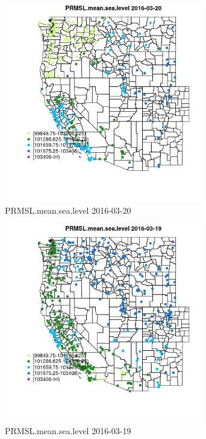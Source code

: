 \begin{figure} 
\centering  
\includegraphics[width=0.77\textwidth]{Code_Outputs/Report_ML_input_PM25_Step4_part_e_de_duplicated_aveswNAs_MapObsPRMSLmeansealevel2016-03-20.jpg} 
\caption{\label{fig:Report_ML_input_PM25_Step4_part_e_de_duplicated_aveswNAsMapObsPRMSLmeansealevel2016-03-20}PRMSL.mean.sea.level 2016-03-20} 
\end{figure} 
 

\begin{figure} 
\centering  
\includegraphics[width=0.77\textwidth]{Code_Outputs/Report_ML_input_PM25_Step4_part_e_de_duplicated_aveswNAs_MapObsPRMSLmeansealevel2016-03-19.jpg} 
\caption{\label{fig:Report_ML_input_PM25_Step4_part_e_de_duplicated_aveswNAsMapObsPRMSLmeansealevel2016-03-19}PRMSL.mean.sea.level 2016-03-19} 
\end{figure} 
 

